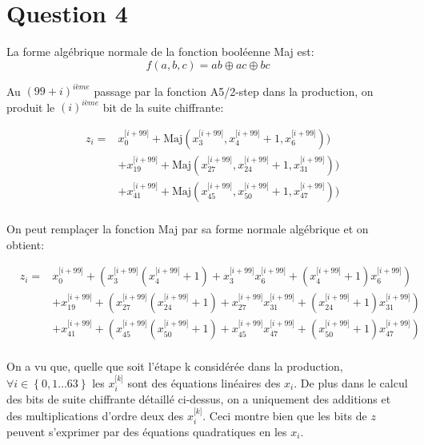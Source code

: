 \section{Question 4}
La forme algébrique normale de la fonction booléenne Maj est:
$$f(a,b,c) = ab \oplus ac \oplus bc$$

Au $(99+i)^{ième}$ passage par la fonction A5/2-step dans la production, on produit le $(i)^{ième}$ bit de la suite chiffrante: 

\begin{equation}
\begin{aligned}
  &z_i =& x^{\lbrack i + 99\rbrack}_0 + \mbox{Maj}(x^{\lbrack i+99\rbrack}_{3}, x^{\lbrack i+99\rbrack}_{4} + 1, x^{\lbrack i+99\rbrack}_{6})) \\
  & &+ x^{\lbrack i + 99\rbrack}_{19} + \mbox{Maj}(x^{\lbrack i+99\rbrack}_{27}, x^{\lbrack i+99\rbrack}_{24} + 1, x^{\lbrack i+99\rbrack}_{31})) \\
  & &+ x^{\lbrack i + 99\rbrack}_{41} + \mbox{Maj}(x^{\lbrack i+99\rbrack}_{45}, x^{\lbrack i+99\rbrack}_{50} + 1, x^{\lbrack i+99\rbrack}_{47})) \\
\end{aligned}
\end{equation}

On peut remplaçer la fonction Maj par sa forme normale algébrique et on obtient:

\begin{equation}
\begin{aligned}
  &z_i =& x^{\lbrack i + 99\rbrack}_0 + (x^{\lbrack i+99\rbrack}_{3}( x^{\lbrack i+99\rbrack}_{4} + 1) + x^{\lbrack i+99\rbrack}_{3} x^{\lbrack i+99\rbrack}_{6} + ( x^{\lbrack i+99\rbrack}_{4} + 1) x^{\lbrack i+99\rbrack}_{6}) \\  
  & &+ x^{\lbrack i + 99\rbrack}_{19} + (x^{\lbrack i+99\rbrack}_{27}(x^{\lbrack i+99\rbrack}_{24} + 1) + x^{\lbrack i+99\rbrack}_{27} x^{\lbrack i+99\rbrack}_{31} + (x^{\lbrack i+99\rbrack}_{24} + 1)x^{\lbrack i+99\rbrack}_{31}) \\  
  & &+ x^{\lbrack i + 99\rbrack}_{41} + (x^{\lbrack i+99\rbrack}_{45} (x^{\lbrack i+99\rbrack}_{50} + 1) + x^{\lbrack i+99\rbrack}_{45} x^{\lbrack i+99\rbrack}_{47} + (x^{\lbrack i+99\rbrack}_{50} + 1)x^{\lbrack i+99\rbrack}_{47}) \\
\end{aligned}
\end{equation}


On a vu que, quelle que soit l'étape k considérée dans la production, $ \forall i \in \left\{ {0,1 \ldots 63}\right\}$ les $x^{\lbrack k \rbrack}_{i}$ sont des équations linéaires des $x_i$. De plus dans le calcul des bits de suite chiffrante détaillé ci-dessus, on a uniquement des additions et des multiplications d'ordre deux des $x^{\lbrack k \rbrack}_{i}$. Ceci montre bien que les bits de $z$ peuvent s'exprimer par des équations quadratiques en les $x_i$.
